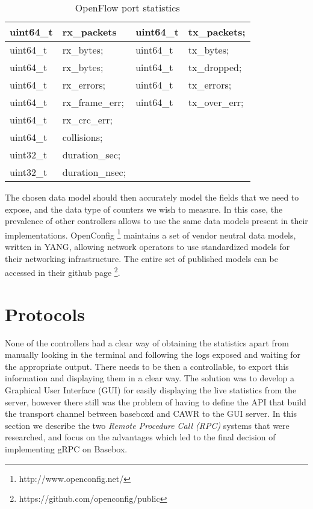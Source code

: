 \begin{table}[]
    \centering
    \caption{OpenFlow port statistics}
    \label{my-label}
    \begin{tabular}{l | l || l | l}
       uint64\_t & rx\_packets     & uint64\_t & tx\_packets;     \\ \hline
       uint64\_t & rx\_bytes;      & uint64\_t & tx\_bytes;       \\ \hline
       uint64\_t & rx\_bytes;      & uint64\_t & tx\_dropped;     \\ \hline
       uint64\_t & rx\_errors;     & uint64\_t & tx\_errors;      \\ \hline
       uint64\_t & rx\_frame\_err; & uint64\_t & tx\_over\_err;   \\ \hline
       uint64\_t & rx\_crc\_err;   &                              \\ \hline
       uint64\_t & collisions;     &                              \\ \hline
       uint32\_t & duration\_sec;  &                              \\ \hline
       uint32\_t & duration\_nsec; &                 
    \end{tabular}
\end{table}

\par The chosen data model should then accurately model the fields that we need to expose, and the data type of counters we wish to measure. In this case, the prevalence of other controllers allows to use the same data models present 
in their implementations. OpenConfig \footnote{http://www.openconfig.net/} maintains a set of vendor neutral data models, written in YANG, allowing network operators to use standardized models for their networking infrastructure.
The entire set of published models can be accessed in their github page \footnote {https://github.com/openconfig/public}.

\section {Protocols}

None of the controllers had a clear way of obtaining the statistics apart from manually looking in the terminal and following the logs exposed and waiting for the appropriate output. There needs to be then a controllable, to export
this information and displaying them in a clear way. The solution was to develop a Graphical User Interface (GUI) for easily displaying the live statistics from the server, however there still was the problem of having to 
define the API that build the transport channel between baseboxd and CAWR to the GUI server. In this section we describe the two \textit {Remote Procedure Call (RPC)} systems that were researched, and focus on the advantages which
led to the final decision of implementing gRPC on Basebox.

